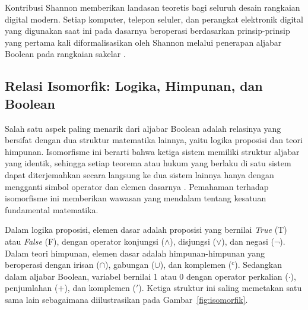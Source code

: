 \begin{catatan}
Kontribusi Shannon memberikan landasan teoretis bagi seluruh desain rangkaian digital modern. Setiap komputer, telepon seluler, dan perangkat elektronik digital yang digunakan saat ini pada dasarnya beroperasi berdasarkan prinsip-prinsip yang pertama kali diformalisasikan oleh Shannon melalui penerapan aljabar Boolean pada rangkaian sakelar \cite{shannon1938}.
\end{catatan}

\subsection{Relasi Isomorfik: Logika, Himpunan, dan Boolean}

Salah satu aspek paling menarik dari aljabar Boolean adalah relasinya yang bersifat  dengan dua struktur matematika lainnya, yaitu logika proposisi dan teori himpunan. Isomorfisme ini berarti bahwa ketiga sistem memiliki struktur aljabar yang identik, sehingga setiap teorema atau hukum yang berlaku di satu sistem dapat diterjemahkan secara langsung ke dua sistem lainnya hanya dengan mengganti simbol operator dan elemen dasarnya \cite{rosen2019}. Pemahaman terhadap isomorfisme ini memberikan wawasan yang mendalam tentang kesatuan fundamental matematika.

Dalam logika proposisi, elemen dasar adalah proposisi yang bernilai \textit{True} (T) atau \textit{False} (F), dengan operator konjungsi ($\wedge$), disjungsi ($\vee$), dan negasi ($\neg$). Dalam teori himpunan, elemen dasar adalah himpunan-himpunan yang beroperasi dengan irisan ($\cap$), gabungan ($\cup$), dan komplemen ($^c$). Sedangkan dalam aljabar Boolean, variabel bernilai 1 atau 0 dengan operator perkalian ($\cdot$), penjumlahan ($+$), dan komplemen ($'$). Ketiga struktur ini saling memetakan satu sama lain sebagaimana diilustrasikan pada Gambar~\ref{fig:isomorfik}.

